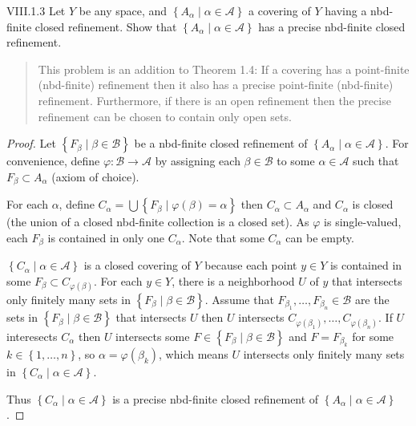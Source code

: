\begin{problem}{VIII.1.3}\label{problem:VIII.1.3}
Let \( Y \) be any space, and \( \left\{ A_{\alpha} \mid \alpha \in \mathscr{A} \right\} \) a covering of \( Y \) having a nbd-finite closed refinement. Show that \( \left\{ A_{\alpha} \mid \alpha \in \mathscr{A} \right\} \) has a precise nbd-finite closed refinement.
\end{problem}

\begin{quotation}
	This problem is an addition to Theorem 1.4: If a covering has a point-finite (nbd-finite) refinement then it also has a precise point-finite (nbd-finite) refinement. Furthermore, if there is an open refinement then the precise refinement can be chosen to contain only open sets.
\end{quotation}

\begin{proof}
	Let \( \left\{ F_{\beta} \mid \beta \in \mathscr{B} \right\} \) be a nbd-finite closed refinement of \( \left\{ A_{\alpha} \mid \alpha \in \mathscr{A} \right\} \). For convenience, define \( \varphi: \mathscr{B} \to \mathscr{A} \) by assigning each \( \beta \in \mathscr{B} \) to some \( \alpha \in \mathscr{A} \) such that \( F_{\beta} \subset A_{\alpha} \) (axiom of choice).

	For each \( \alpha \), define \( C_{\alpha} = \bigcup \left\{ F_{\beta} \mid \varphi(\beta) = \alpha \right\} \) then \( C_{\alpha} \subset A_{\alpha} \) and \( C_{\alpha} \) is closed (the union of a closed nbd-finite collection is a closed set). As \( \varphi \) is single-valued, each \( F_{\beta} \) is contained in only one \( C_{\alpha} \). Note that some \( C_{\alpha} \) can be empty.

	\( \left\{ C_{\alpha} \mid \alpha \in \mathscr{A} \right\} \) is a closed covering of \( Y \) because each point \( y \in Y \) is contained in some \( F_{\beta} \subset C_{\varphi(\beta)} \). For each \( y \in Y \), there is a neighborhood \( U \) of \( y \) that intersects only finitely many sets in \( \left\{ F_{\beta} \mid \beta \in \mathscr{B} \right\} \). Assume that \( F_{\beta_{1}}, \ldots, F_{\beta_{n}} \in \mathscr{B} \) are the sets in \( \left\{ F_{\beta} \mid \beta \in \mathscr{B} \right\} \) that intersects \( U \) then \( U \) intersects \( C_{\varphi(\beta_{1})}, \ldots, C_{\varphi(\beta_{n})} \). If \( U \) interesects \( C_{\alpha} \) then \( U \) intersects some \( F \in \left\{ F_{\beta} \mid \beta \in \mathscr{B} \right\} \) and \( F = F_{\beta_{k}} \) for some \( k \in \left\{ 1, \ldots, n \right\} \), so \( \alpha = \varphi(\beta_{k}) \), which means \( U \) intersects only finitely many sets in \( \left\{ C_{\alpha} \mid \alpha \in \mathscr{A} \right\} \).

	Thus \( \left\{ C_{\alpha} \mid \alpha \in \mathscr{A} \right\} \) is a precise nbd-finite closed refinement of \( \left\{ A_{\alpha} \mid \alpha \in \mathscr{A} \right\} \).
\end{proof}

